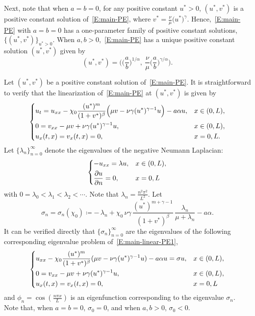 \documentclass[11pt]{article} %
\theoremstyle{remark}
\theoremstyle{remark}
\numberwithin{equation}{section}
\numberwithin{figure}{section}
\numberwithin{table}{section}
\begin{document}
Next, note that when $a = b = 0$, for any positive constant $u^* > 0$,
$(u^*,v^*)$ is a positive constant solution of~\eqref{E:main-PE}, where $v^* =
\frac{\nu}{\mu} \big( u^*\big)^{\gamma}$. Hence,~\eqref{E:main-PE} with $a = b =
0$ has a one-parameter family of positive constant solutions,
$\{(u^*,v^*)\}_{u^*>0}$. When $a, b > 0$,~\eqref{E:main-PE} has a unique
positive constant solution $(u^*, v^*)$ given by
\begin{equation}\label{E:equilibrium}
  (u^*, v^*) = \Big(\big(\frac{a}{b}\big)^{1/\alpha},
  \:\frac{\nu}{\mu}\big(\frac{a}{b}\big)^{\gamma/\alpha}\Big).
\end{equation}


Let $(u^*,v^*)$ be a positive constant solution of~\eqref{E:main-PE}. It is
straightforward to verify that the linearization of~\eqref{E:main-PE} at
$(u^*,v^*)$ is given by
\begin{equation}\label{E:main-linear-PE1}
  \begin{dcases}
    u_t = u_{xx} - \chi_0\frac{(u^*)^m}{(1+v^*)^\beta}\Big(\mu v-\nu \gamma(u^*)^{\gamma-1}u\Big)-a\alpha u, & x\in(0,L), \cr
    0 = v_{xx} - \mu v + \nu \gamma(u^*)^{\gamma-1}u,                                                        & x\in(0,L), \cr
    u_x(t,x)=v_x(t,x)=0,                                                                                     & x=0,L.
  \end{dcases}
\end{equation}
Let $\big\{\lambda_n\big\}_{n=0}^\infty$ denote the eigenvalues of the negative
Neumann Laplacian:
\begin{align*}
  \begin{dcases}
    - u_{xx}                    = \lambda u, & x\in (0,L), \cr
    \frac{\partial u}{\partial n} = 0,       & x=0,L
  \end{dcases}
\end{align*}
with $0 = \lambda_0 < \lambda_1 < \lambda_2 < \cdots$. Note that $\lambda_n =
\frac{n^2\pi^2}{L^2}$. Let
\begin{equation}\label{E:sigma_n}
  \sigma_n =
  \sigma_n(\chi_0) \coloneqq
  -\,\lambda_n
  + \chi_0\,\nu\gamma\,
  \frac{(u^*)^{m+\gamma-1}}{(1+v^*)^\beta}\,\frac{\lambda_n}{\mu+\lambda_n}
  - a\alpha.
\end{equation}
It can be verified directly that $\big\{\sigma_n\big\}_{n=0}^\infty$ are the
eigenvalues of the following corresponding eigenvalue problem
of~\eqref{E:main-linear-PE1},
\begin{equation}\label{E:main-linear-PE2}
  \begin{dcases}
    u_{xx}-\chi_0\frac{(u^*)^m}{(1+v^*)^\beta}(\mu v-\nu \gamma(u^*)^{\gamma-1}u)-a\alpha u=\sigma u, & x\in(0,L),\cr
    0 = v_{xx}-\mu v+\nu \gamma(u^*)^{\gamma-1}u,                                                     & x\in(0,L), \cr
    u_x(t,x)=v_x(t,x)=0,                                                                              & x=0,L
  \end{dcases}
\end{equation}
and $\phi_n = \cos(\frac{n\pi x}{L})$ is an eigenfunction corresponding to the
eigenvalue $\sigma_n$. Note that, when $a = b = 0$, $\sigma_0 = 0$, and when $a,
b > 0$, $\sigma_0 < 0$.
\end{document}
